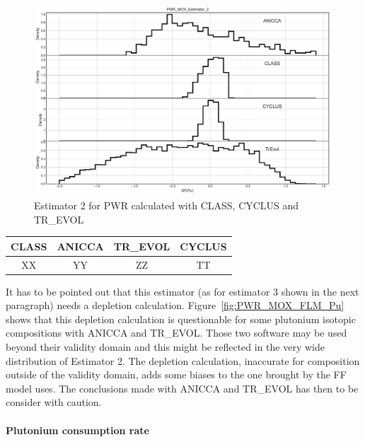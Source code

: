 \begin{figure}[h]
	\begin{center}
		\includegraphics[width = 0.99\textwidth]{../../Feature_1/RAW_DATA/FIG/PWR_MOX_Estimator_2.pdf}
		\caption{Estimator 2 for \gls{PWR} calculated with CLASS, CYCLUS and TR\_EVOL}
		\label{fig:Est2_PWR}
	\end{center}
\end{figure}

\begin{table}[h]
	\begin{center}
		\begin{tabular}{|c||c||c||c|}
			\hline 
				CLASS & ANICCA & TR\_EVOL & CYCLUS \\
			\hline
				XX & YY & ZZ & TT \\
		\end{tabular}
	\end{center}
	\label{table:Est2_PWR}
\end{table}

It has to be pointed out that this estimator (as for estimator 3 shown in the
next paragraph) needs a depletion calculation.  Figure~\ref{fig:PWR_MOX_FLM_Pu}
shows that this depletion calculation is questionable for some plutonium
isotopic compositions with ANICCA and TR\_EVOL.  Those two software may be used
beyond their validity domain and this might be reflected in the very wide
distribution of Estimator 2. The depletion calculation, inaccurate for
composition outside of the validity domain, adds some biases to the one brought
by the \gls{FF} model uses. The conclusions made with ANICCA and TR\_EVOL has
then to be consider with caution.

\paragraph{Plutonium consumption rate}

